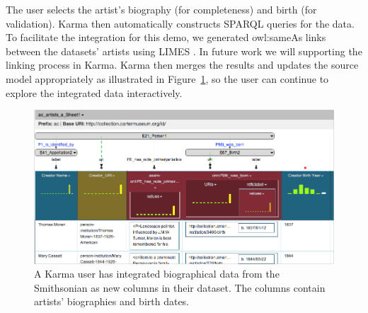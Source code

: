 The user selects the artist's biography (for completeness) and birth (for validation). Karma then automatically constructs SPARQL queries for the data.
To facilitate the integration for this demo, we generated owl:sameAs links between the datasets' artists using LIMES \cite{ngomo2011limes}.  
In future work we will supporting the linking process in Karma.
Karma then merges the results and updates the source model appropriately as illustrated in Figure~\ref{fig:augment-screenshot}, so the user can continue to explore the integrated data interactively. 
\begin{figure}[bt]
\centering
\includegraphics[width=4.9in]{images/6-augment.png}
\vspace{-5mm}
\caption{A Karma user has integrated biographical data from the Smithsonian as new columns in their dataset. The columns contain artists' biographies and birth dates.}
\vspace{-21pt}
\label{fig:augment-screenshot}
\end{figure}
